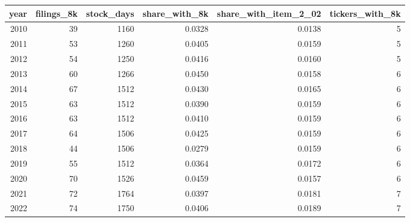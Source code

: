 \begin{tabular}{rrrrrr}
\toprule
year & filings\_8k & stock\_days & share\_with\_8k & share\_with\_item\_2\_02 & tickers\_with\_8k \\
\midrule
2010 & 39 & 1160 & 0.0328 & 0.0138 & 5 \\
2011 & 53 & 1260 & 0.0405 & 0.0159 & 5 \\
2012 & 54 & 1250 & 0.0416 & 0.0160 & 5 \\
2013 & 60 & 1266 & 0.0450 & 0.0158 & 6 \\
2014 & 67 & 1512 & 0.0430 & 0.0165 & 6 \\
2015 & 63 & 1512 & 0.0390 & 0.0159 & 6 \\
2016 & 63 & 1512 & 0.0410 & 0.0159 & 6 \\
2017 & 64 & 1506 & 0.0425 & 0.0159 & 6 \\
2018 & 44 & 1506 & 0.0279 & 0.0159 & 6 \\
2019 & 55 & 1512 & 0.0364 & 0.0172 & 6 \\
2020 & 70 & 1526 & 0.0459 & 0.0157 & 6 \\
2021 & 72 & 1764 & 0.0397 & 0.0181 & 7 \\
2022 & 74 & 1750 & 0.0406 & 0.0189 & 7 \\
\bottomrule
\end{tabular}
